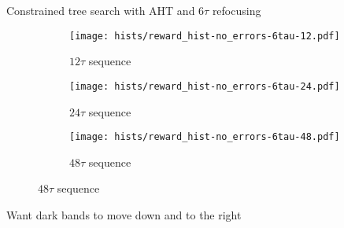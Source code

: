 \documentclass{beamer}
\begin{document}
\begin{frame}{Constrained tree search with AHT and $6\tau$ refocusing}
%
\begin{figure}[H]
    \centering
    \begin{subfigure}{.49\textwidth}
        \centering
        \texttt{[image: hists/reward\_hist-no\_errors-6tau-12.pdf]}
        \caption{$12\tau$ sequence}
        \label{fig:reward_hist-no_errors-6tau-12}
    \end{subfigure}
    \begin{subfigure}{.49\textwidth}
        \centering
        \texttt{[image: hists/reward\_hist-no\_errors-6tau-24.pdf]}
        \caption{$24\tau$ sequence}
        \label{fig:reward_hist-no_errors-6tau-24}
    \end{subfigure}
    \begin{subfigure}{.49\textwidth}
        \centering
        \texttt{[image: hists/reward\_hist-no\_errors-6tau-48.pdf]}
        \caption{$48\tau$ sequence}
        \label{fig:reward_hist-no_errors-6tau-48}
    \end{subfigure}
\end{figure}

Want dark bands to move down and to the right


\end{frame}
\end{document}
